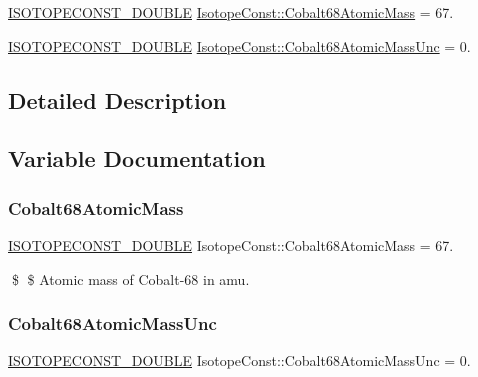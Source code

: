 \begin{DoxyCompactItemize}
\item 
\mbox{\hyperlink{group___isotope_const-_macros_ga8f45a7272ce02c0b4c65c44636ed719a}{I\+S\+O\+T\+O\+P\+E\+C\+O\+N\+S\+T\+\_\+\+D\+O\+U\+B\+LE}} \mbox{\hyperlink{group___isotope_const-_cobalt-_co68_ga894f66973316792e955f377fff29f3ad}{Isotope\+Const\+::\+Cobalt68\+Atomic\+Mass}} = 67.
\item 
\mbox{\hyperlink{group___isotope_const-_macros_ga8f45a7272ce02c0b4c65c44636ed719a}{I\+S\+O\+T\+O\+P\+E\+C\+O\+N\+S\+T\+\_\+\+D\+O\+U\+B\+LE}} \mbox{\hyperlink{group___isotope_const-_cobalt-_co68_ga1916d624034f49b51e35e30e0abb90c7}{Isotope\+Const\+::\+Cobalt68\+Atomic\+Mass\+Unc}} = 0.
\end{DoxyCompactItemize}


\subsection{Detailed Description}


\subsection{Variable Documentation}
\mbox{\label{group___isotope_const-_cobalt-_co68_ga894f66973316792e955f377fff29f3ad}} 
\subsubsection{\texorpdfstring{Cobalt68\+Atomic\+Mass}{Cobalt68AtomicMass}}
{\footnotesize\ttfamily \mbox{\hyperlink{group___isotope_const-_macros_ga8f45a7272ce02c0b4c65c44636ed719a}{I\+S\+O\+T\+O\+P\+E\+C\+O\+N\+S\+T\+\_\+\+D\+O\+U\+B\+LE}} Isotope\+Const\+::\+Cobalt68\+Atomic\+Mass = 67.}

\$ \$ Atomic mass of Cobalt-\/68 in amu. \mbox{\label{group___isotope_const-_cobalt-_co68_ga1916d624034f49b51e35e30e0abb90c7}} 
\subsubsection{\texorpdfstring{Cobalt68\+Atomic\+Mass\+Unc}{Cobalt68AtomicMassUnc}}
{\footnotesize\ttfamily \mbox{\hyperlink{group___isotope_const-_macros_ga8f45a7272ce02c0b4c65c44636ed719a}{I\+S\+O\+T\+O\+P\+E\+C\+O\+N\+S\+T\+\_\+\+D\+O\+U\+B\+LE}} Isotope\+Const\+::\+Cobalt68\+Atomic\+Mass\+Unc = 0.}

